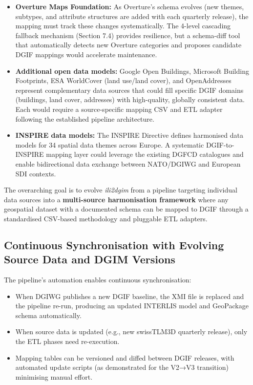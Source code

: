 \documentclass[conference]{IEEEtran}
\begin{document}
\begin{itemize}[leftmargin=*]
\item \textbf{Overture Maps Foundation:} As Overture's schema evolves (new themes, subtypes, and attribute structures are added with each quarterly release), the mapping must track these changes systematically. The 4-level cascading fallback mechanism (Section 7.4) provides resilience, but a schema-diff tool that automatically detects new Overture categories and proposes candidate DGIF mappings would accelerate maintenance.
\end{itemize}

\begin{itemize}[leftmargin=*]
\item \textbf{Additional open data models:} Google Open Buildings, Microsoft Building Footprints, ESA WorldCover (land use/land cover), and OpenAddresses represent complementary data sources that could fill specific DGIF domains (buildings, land cover, addresses) with high-quality, globally consistent data. Each would require a source-specific mapping CSV and ETL adapter following the established pipeline architecture.
\end{itemize}

\begin{itemize}[leftmargin=*]
\item \textbf{INSPIRE data models:} The INSPIRE Directive defines harmonised data models for 34 spatial data themes across Europe. A systematic DGIF-to-INSPIRE mapping layer could leverage the existing DGFCD catalogues and enable bidirectional data exchange between NATO/DGIWG and European SDI contexts.
\end{itemize}

The overarching goal is to evolve \textit{ili2dgim} from a pipeline targeting individual data sources into a \textbf{multi-source harmonisation framework} where any geospatial dataset with a documented schema can be mapped to DGIF through a standardised CSV-based methodology and pluggable ETL adapters.

\subsection{Continuous Synchronisation with Evolving Source Data and DGIM Versions}

The pipeline's automation enables continuous synchronisation:

\begin{itemize}[leftmargin=*]
\item When DGIWG publishes a new DGIF baseline, the XMI file is replaced and the pipeline re-run, producing an updated INTERLIS model and GeoPackage schema automatically.
\item When source data is updated (e.g., new swissTLM3D quarterly release), only the ETL phases need re-execution.
\item Mapping tables can be versioned and diffed between DGIF releases, with automated update scripts (as demonstrated for the V2→V3 transition) minimising manual effort.
\end{itemize}
\end{document}
